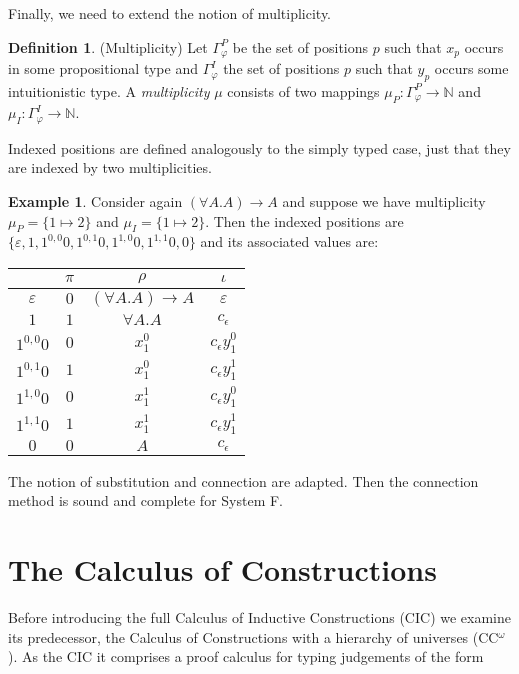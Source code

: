 \documentclass[11pt]{article}
\theoremstyle{definition}
\theoremstyle{definition}
\theoremstyle{definition}
\theoremstyle{definition}
\theoremstyle{definition}
\newtheorem{definition}[theorem]{Definition}
\theoremstyle{definition}
\newtheorem{example}[theorem]{Example}
\theoremstyle{definition}
\newcommand{\N}{\mathbb N}
\begin{document}
	Finally, we need to extend the notion of multiplicity.

	\begin{definition}(Multiplicity)
		Let $\Gamma_\varphi^P$ be the set of positions $p$ such that $x_p$ occurs in some propositional type and $\Gamma_\varphi^I$ the set of positions $p$ such that $y_p$ occurs some intuitionistic type. A \emph{multiplicity} $\mu$ consists of two mappings $\mu_P: \Gamma_\varphi^P\to\N$ and $\mu_I: \Gamma_\varphi^I\to\N$.
	\end{definition}

	Indexed positions are defined analogously to the simply typed case, just that they are indexed by two multiplicities.

	\begin{example}
		Consider again $(\forall A. A)\to A$ and suppose we have multiplicity $\mu_P = \{1\mapsto 2\}$ and $\mu_I = \{1\mapsto 2\}$. Then the indexed positions are $\{\varepsilon, 1, 1^{0,0}0, 1^{0,1}0, 1^{1,0}0, 1^{1,1}0, 0\}$ and its associated values are:
		\begin{center}
			\begin{tabular}[]{c|c|c|c}
				& $\pi$ & $\rho$ & $\iota$\\\hline
				$\varepsilon$ & $0$ & $(\forall A. A)\to A$ & $\varepsilon$\\
				$1$ & $1$ & $\forall A.A$ & $c_\epsilon$\\
				$1^{0,0}0$ & $0$ & $x_1^0$ & $c_\epsilon y_1^{0}$\\
				$1^{0,1}0$ & $1$ & $x_1^0$ & $c_\epsilon y_1^{1}$\\
				$1^{1,0}0$ & $0$ & $x_1^1$ & $c_\epsilon y_1^{0}$\\
				$1^{1,1}0$ & $1$ & $x_1^1$ & $c_\epsilon y_1^{1}$\\
				$0$ & $0$ & $A$ & $c_\epsilon$
			\end{tabular}
		\end{center}
	\end{example}

	The notion of substitution and connection are adapted. Then the connection method is sound and complete for System F.


	\pagebreak

    \section{The Calculus of Constructions}
    Before introducing the full Calculus of Inductive Constructions (CIC) we examine its predecessor, the Calculus of Constructions with a hierarchy of universes (CC$^\omega$). As the CIC it comprises a proof calculus for typing judgements of the form~
\end{document}
